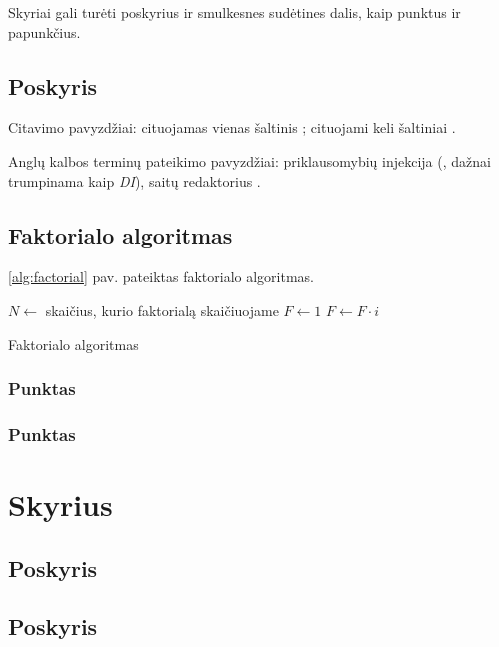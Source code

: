 \documentclass{VUMIFPSbakalaurinis}
\begin{document}
Skyriai gali turėti poskyrius ir smulkesnes sudėtines dalis, kaip punktus ir
papunkčius.

\subsection{Poskyris}
Citavimo pavyzdžiai: cituojamas vienas šaltinis \cite{PvzStraipsnLt}; cituojami
keli šaltiniai \cite{PvzStraipsnEn, PvzStraipsnLta, PvzKonfLt, PvzKonfEn, PvzKnygLt, PvzKnygEn,
PvzElPubLt, PvzElPubEn, PvzBakLt, PvzMagistrLt, PvzPhdEn}.

Anglų kalbos terminų pateikimo pavyzdžiai: priklausomybių injekcija (,
dažnai trumpinama kaip \textit{DI}), saitų redaktorius .

\subsection{Faktorialo algoritmas}

\ref{alg:factorial} pav. pateiktas faktorialo algoritmas.

\begin{algorithm}
\begin{algorithmic}[1] %
\State $N\gets$ skaičius, kurio faktorialą skaičiuojame
\State $F\gets 1$
    \State $F\gets F \cdot i$
\EndFor
\end{algorithmic}
\caption{Faktorialo algoritmas}
\label{alg:factorial}
\end{algorithm}

\subsubsection{Punktas}
\subsubsection{Punktas}
\section{Skyrius}
\subsection{Poskyris}
\subsection{Poskyris}
\end{document}
